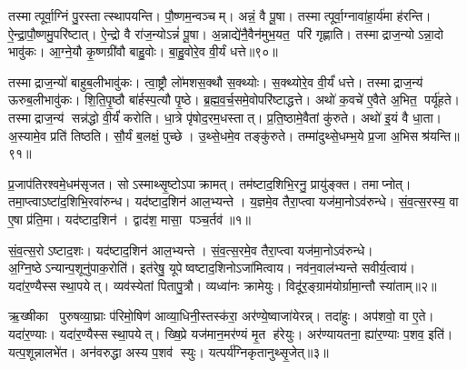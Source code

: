 तस्मात्पूर्वा॒ग्निं पु॒रस्तात्स्थापयन्ति। पौ॒ष्णम॒न्वञ्चम्। अन्नं॒ वै पू॒षा। तस्मात्पूर्वा॒ग्नावा॑हा॒र्य॑मा ह॑रन्ति। ऐ॒न्द्रा॒पौ॒ष्णमु॒परि॑ष्टात्। ऐ॒न्द्रो वै रा॑ज॒न्योऽन्नं॑ पू॒षा। अ॒न्नाद्ये॑नै॒वैन॑मुभ॒यत॒ परि॑ गृह्णाति। तस्माद्राज॒न्योऽन्ना॒दो भावु॑कः। आ॒ग्ने॒यौ कृ॒ष्णग्री॑वौ बाहु॒वोः। बा॒हु॒वोरे॒व वी॒र्यं धत्ते॥९०॥

तस्माद्राज॒न्यो॑ बाहुब॒लीभावु॑कः। त्वा॒ष्ट्रौ लो॑मशस॒क्थौ स॒क्थ्योः। स॒क्थ्योरे॒व वी॒र्यं॑ धत्ते। तस्माद्राज॒न्य॑ ऊरुब॒लीभावु॑कः। शि॒ति॒पृ॒ष्ठौ बा॑र्\mbox{}हस्प॒त्यौ पृ॒ष्ठे। ब्र॒ह्म॒व॒र्च॒समे॒वोपरि॑ष्टाद्धत्ते। अथो॑ क॒वचे॑ ए॒वैते अ॒भित॒ पर्यू॑हते। तस्माद्राज॒न्य॑ सन्न॑द्धो वी॒र्यं॑ करोति। धा॒त्रे पृ॑षोद॒रम॒धस्तात्। प्र॒ति॒ष्ठामे॒वैतां कु॑रुते। अथो॑ इ॒यं वै धा॒ता। अ॒स्यामे॒व प्रति॑ तिष्ठति। सौ॒र्यं ब॒लक्षं॒ पुच्छे। उ॒थ्से॒धमे॒व तङ्कु॑रुते। तम्मा॑दुथ्से॒धम्भ॒ये प्र॒जा अ॒भिसश्र॑यन्ति॥९१॥



\clearpage
{}
\setcounter{anuvakam}{0}
प्र॒जाप॑तिरश्वमे॒धम॑सृजत। सोऽस्माथ्सृ॒ष्टोऽपाक्रामत्। तम॑ष्टाद॒शिभि॒रनु॒ प्रायु॑ङ्क्त। तमाप्नोत्। तमा॒प्त्वाऽष्टा॑द॒शिभि॒रवा॑रुन्ध। यद॑ष्टाद॒शिन॑ आल॒भ्यन्ते। य॒ज्ञमे॒व तैरा॒प्त्वा यज॑मा॒नोऽव॑रुन्धे। सं॒व॒त्स॒रस्य॒ वा ए॒षा प्र॑ति॒मा। यद॑ष्टाद॒शिन॑। द्वाद॑श॒ मासा॒ पञ्च॒र्तव॑॥१॥

सं॒व॒त्स॒रोऽष्टाद॒शः। यद॑ष्टाद॒शिन॑ आल॒भ्यन्ते। सं॒व॒त्स॒रमे॒व तैरा॒प्त्वा यज॑मा॒नोऽव॑रुन्धे। अ॒ग्नि॒ष्ठेऽन्यान्प॒शूनु॑पाक॒रोति॑। इत॑रेषु॒ यूपेष्वष्टाद॒शिनोऽजा॑मित्वाय। नव॑न॒वाल॑भ्यन्ते सवीर्य॒त्वाय॑। यदा॑र॒ण्यैस्सस्था॒पयेत्। व्यव॑स्येतां पितापु॒त्रौ। व्यध्वा॑नः क्रामेयुः। विदू॑र॒ङ्ग्राम॑योर्ग्रामा॒न्तौ स्या॑ताम्॥२॥

ऋ॒ख्षीका पुरुषव्या॒घ्राः प॑रिमो॒षिण॑ आव्या॒धिनी॒स्तस्क॑रा॒ अर॑ण्ये॒ष्वाजा॑येरन्न्। तदा॑हुः। अप॑शवो॒ वा ए॒ते। यदा॑र॒ण्याः। यदा॑र॒ण्यैस्सस्था॒पयेत्। ख्षि॒प्रे यज॑मान॒मर॑ण्यं मृ॒त ह॑रेयुः। अर॑ण्यायतना॒ ह्या॑र॒ण्याः प॒शव॒ इति॑। यत्प॒शून्नालभे॑त। अन॑वरुद्धा अस्य प॒शव॑ स्युः। यत्पर्य॑ग्निकृतानुथ्सृ॒जेत्॥३॥

